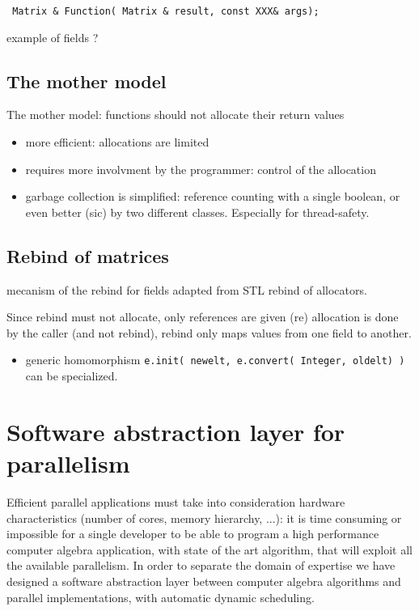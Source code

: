 \documentclass[runningheads,a4paper]{llncs}
\begin{document}
\verb! Matrix & Function( Matrix & result, const XXX& args); !

example of fields \cite[\S 2.1]{jgd:2002:icms} ?

\subsection{The mother model}


The mother model: functions should not allocate their return values

\begin{itemize}
\item more efficient: allocations are limited

\item requires more involvment by the programmer: control of the allocation

\item garbage collection is simplified: reference counting with a single
boolean, or even better (sic) by two different classes.
Especially for thread-safety.
\end{itemize}


\subsection{Rebind of matrices}

mecanism of the rebind for fields adapted from STL rebind of
allocators.

Since rebind must not allocate, only references are given (re)
allocation is done by the caller (and not rebind), rebind only maps
values from one field to another.

\begin{itemize}
\item generic homomorphism 
\verb!e.init( newelt, e.convert( Integer, oldelt) )!
can be specialized.
\end{itemize}

\section{Software abstraction layer for parallelism}

Efficient parallel applications must take into consideration hardware
characteristics (number of cores, memory hierarchy, ...): it is time
consuming or impossible for a single developer to be able to
program a high performance computer algebra application, with state of
the art algorithm, that will exploit all the available parallelism.  
In order to separate the domain of expertise we have designed a
software abstraction layer between computer algebra algorithms
and parallel implementations, with automatic dynamic scheduling.
\end{document}
